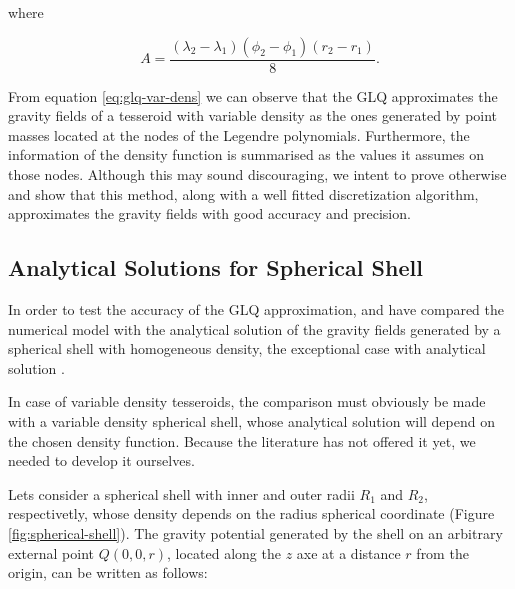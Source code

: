 \documentclass[extra]{gji}
\begin{document}
\noindent where

\begin{equation}
    A = 
    \frac{(\lambda_2 - \lambda_1)(\phi_2 - \phi_1)(r_2 - r_1)}{8}.
\end{equation}

From equation \ref{eq:glq-var-dens} we can observe that the GLQ approximates the gravity fields of a tesseroid with variable density as the ones generated by point masses located at the nodes of the Legendre polynomials.
Furthermore, the information of the density function is summarised as the values it assumes on those nodes.
Although this may sound discouraging, we intent to prove otherwise and show that this method, along with a well fitted discretization algorithm, approximates the gravity fields with good accuracy and precision.


\subsection{Analytical Solutions for Spherical Shell}

In order to test the accuracy of the GLQ approximation, \citet{Uieda2016} and \citet{Grombein2013} have compared the numerical model with the analytical solution of the gravity fields generated by a spherical shell with homogeneous density, the exceptional case with analytical solution \citep{Mikuska2006,Grombein2013}.

In case of variable density tesseroids, the comparison must obviously be made with a variable density spherical shell, whose analytical solution will depend on the chosen density function.
Because the literature has not offered it yet, we needed to develop it ourselves. 

Lets consider a spherical shell with inner and outer radii $R_1$ and $R_2$, respectivetly, whose density depends on the radius spherical coordinate (Figure \ref{fig:spherical-shell}).
The gravity potential generated by the shell on an arbitrary external point $Q(0,0,r)$, located along the $z$ axe at a distance $r$ from the origin, can be written as follows:
\end{document}
